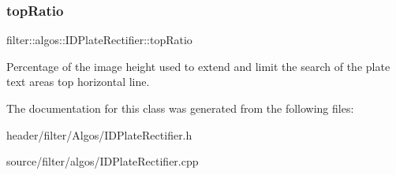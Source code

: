\subsubsection{\texorpdfstring{top\+Ratio}{topRatio}}
{\footnotesize\ttfamily filter\+::algos\+::\+I\+D\+Plate\+Rectifier\+::top\+Ratio}

Percentage of the image height used to extend and limit the search of the plate text area\textquotesingle{}s top horizontal line. 

The documentation for this class was generated from the following files\+:\begin{DoxyCompactItemize}
\item 
header/filter/\+Algos/I\+D\+Plate\+Rectifier.\+h\item 
source/filter/algos/I\+D\+Plate\+Rectifier.\+cpp\end{DoxyCompactItemize}
